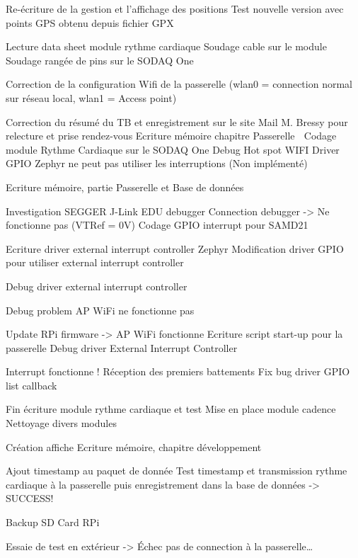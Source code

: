 \begin{multicols}{2}
Re-écriture de la gestion et l’affichage des positions
Test nouvelle version avec points GPS obtenu depuis fichier GPX

Lecture data sheet module rythme cardiaque
Soudage cable sur le module
Soudage rangée de pins sur le SODAQ One

Correction de la configuration Wifi de la passerelle (wlan0 = connection normal sur réseau local, wlan1 = Access point)

Correction du résumé du TB et enregistrement sur le site
Mail M. Bressy pour relecture et prise rendez-vous
Ecriture mémoire chapitre Passerelle

Codage module Rythme Cardiaque sur le SODAQ One
Debug Hot spot WIFI
Driver GPIO Zephyr ne peut pas utiliser les interruptions (Non implémenté)

Ecriture mémoire, partie Passerelle et Base de données

Investigation SEGGER J-Link EDU debugger
Connection debugger -> Ne fonctionne pas (VTRef = 0V)
Codage GPIO interrupt pour SAMD21

Ecriture driver external interrupt controller Zephyr
Modification driver GPIO pour utiliser external interrupt controller

Debug driver external interrupt controller

Debug problem AP WiFi ne fonctionne pas

Update RPi firmware -> AP WiFi fonctionne
Ecriture script start-up pour la passerelle
Debug driver External Interrupt Controller

Interrupt fonctionne ! Réception des premiers battements
Fix bug driver GPIO list callback

Fin écriture module rythme cardiaque et test
Mise en place module cadence
Nettoyage divers modules

Création affiche
Ecriture mémoire, chapitre développement

Ajout timestamp au paquet de donnée
Test timestamp et transmission rythme cardiaque à la passerelle puis enregistrement dans la base de données -> SUCCESS!

Backup SD Card RPi

Essaie de test en extérieur -> Échec pas de connection à la passerelle…


\end{multicols}
